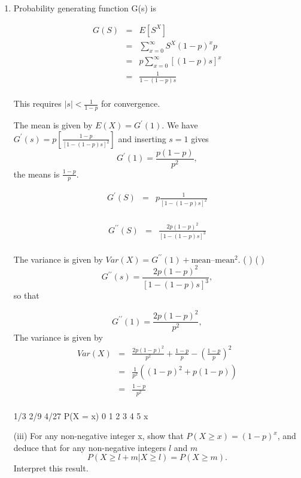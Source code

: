 \documentclass[a4paper,12pt]{article}
\begin{document}
\begin{enumerate}
    \item Probability generating function G(s) is

\begin{eqnarray*}
G(S) &=& E[S^X] \\
  &=& \sum^{\infty}_{x=0} S^X(1-p)^xp \\
  &=& p \sum^{\infty}_{x=0} [(1-p)s]^x\\
   &=& \frac{1}{1-(1-p)s} \\
\end{eqnarray*}

This requires $ {\displaystyle|s| < \frac{1}{1-p} }$ for convergence.

The mean is given by $E(X) = G^{\prime}(1)$.
We have $ {\displaystyle G^{\prime}(s) = p\left[ \frac{1-p}{[1-(1-p)s]^2} \right] }$
and inserting $s=1$ gives 
\[ G^{\prime}(1) = \frac{p(1-p)}{p^2},\] the 
means is ${ \displaystyle \frac{1-p}{p} }.$

\begin{eqnarray*}
G^{\prime}(S)     
  &=& p \frac{1}{[1-(1-p)s]^2} \\
\end{eqnarray*}


\begin{eqnarray*}
G^{\prime\prime}(S)     
  &=&  \frac{2p(1-p)^2}{[1-(1-p)s]^3} \\
\end{eqnarray*}



The variance is given by $Var(X) = G^{\prime\prime}(1) + \mbox{mean} – \mbox{mean}^2$. ( ) ( )
\[ G^{\prime\prime}(s) = \frac{2p(1-p)^2}{[1-(1-p)s]^3},\]
so that


\[ G^{\prime\prime}(1) = \frac{2p(1-p)^2}{p^2},\]
The variance is given by
\begin{eqnarray*}
Var(X)    
&=&  \frac{2p(1-p)^2}{p^2}  + \frac{1-p}{p} - \left( \frac{1-p}{p}  \right)^2 \\
&=&  \frac{1}{p^2}\left( (1-p)^2 + p(1-p)  \right) \\
&=& \frac{1-p}{p^2} \\
\end{eqnarray*}

1/3
2/9
4/27
P(X = x)
0 1 2 3 4 5
x
\begin{framed}
(iii) For any non-negative integer x, show that $P(X \geq x) = (1-p)^x$, and deduce
that for any non-negative integers $l$ and $m$
\[P( X \geq l + m| X \geq l ) = P( X \geq m).\] 
Interpret this result.
\end{framed}


\end{enumerate}
\end{document}
